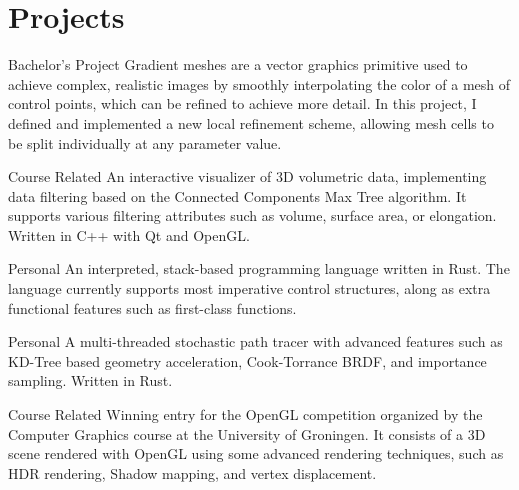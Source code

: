\section*{Projects}
{Bachelor's Project} %
{} %
{} %
{%
    Gradient meshes are a vector graphics primitive used to achieve complex, realistic images by smoothly interpolating the color of a mesh of control points, which can be refined to achieve more detail. In this project, I defined and implemented a new local refinement scheme, allowing mesh cells to be split individually at any parameter value.
}

{Course Related} %
{} %
{} %
{%
    An interactive visualizer of 3D volumetric data, implementing data filtering based on the Connected Components Max Tree algorithm. It supports various filtering attributes such as volume, surface area, or elongation. Written in C++ with Qt and OpenGL.
}

{Personal} %
{} %
{} %
{%
    An interpreted, stack-based programming language written in Rust. The language currently supports most imperative control structures, along as extra functional features such as first-class functions.
}

{Personal} %
{} %
{} %
{%
    A multi-threaded stochastic path tracer with advanced features such as KD-Tree based geometry acceleration, Cook-Torrance BRDF, and importance sampling. Written in Rust.
}

{Course Related} %
{} %
{} %
{%
    Winning entry for the OpenGL competition organized by the Computer Graphics course at the University of Groningen. It consists of a 3D scene rendered with OpenGL using some advanced rendering techniques, such as HDR rendering, Shadow mapping, and vertex displacement.
}
